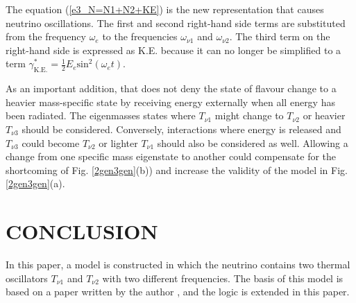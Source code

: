 \documentclass[%
 reprint,
 amsmath,amssymb,
 aps,
]{revtex4-1}
\numberwithin{equation}{section}%
\begin{document}

The equation (\ref{e3_N=N1+N2+KE}) is the new representation that causes neutrino oscillations. The first and second right-hand side terms are substituted from the frequency $\omega_e$ to the frequencies $\omega_{\nu 1}$ and $\omega_{\nu 2}$. The third term on the right-hand side is expressed as K.E. because it can no longer be simplified to a term $\gamma^{*}_{\mathrm{K.E.}} = \frac{1}{2} E_{e} \mathrm{sin}^{2} (\omega_e t)$.



As an important addition, that does not deny the state of flavour change to a heavier mass-specific state by receiving energy externally when all energy has been radiated. The eigenmasses states where $T_{\nu \mathrm{1}}$ might change to $T_{\nu \mathrm{2}}$ or heavier $T_{\nu \mathrm{3}}$ should be considered. Conversely, interactions where energy is released and $T_{\nu \mathrm{3}}$ could become $T_{\nu \mathrm{2}}$ or lighter $T_{\nu \mathrm{1}}$ should also be considered as well. Allowing a change from one specific mass eigenstate to another could compensate for the shortcoming of Fig. \ref{2gen3gen}(b)) and increase the validity of the model in Fig. \ref{2gen3gen}(a).



\section{\label{sec:CONCLUSION}CONCLUSION}


In this paper, a model is constructed in which the neutrino contains two thermal oscillators $T_{\nu \mathrm{1}}$ and $T_{\nu \mathrm{2}}$ with two different frequencies. The basis of this model is based on a paper written by the author \cite{Hanamura1}, and the logic is extended in this paper.

\end{document}

